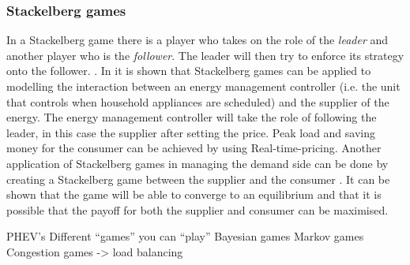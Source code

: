 \subsubsection{Stackelberg games}
In a Stackelberg game there is a player who takes on the role of the \textit{leader} and another player who is the \textit{follower}. The leader will then try to enforce its strategy onto the follower. \cite{ShohamLeyton-Brown2008}.
In \cite{ChenKishoreSnyder2011} it is shown that Stackelberg games can be applied to modelling the interaction between an energy management controller (i.e. the unit that controls when household appliances are scheduled) and the supplier of the energy. The energy management controller will take the role of following the leader, in this case the supplier after setting the price. Peak load and saving money for the consumer can be achieved by using Real-time-pricing. Another application of Stackelberg games in managing the demand side can be done by creating a Stackelberg game between the supplier and the consumer \cite{MaharjanZhuZhangEtAl2013}. It can be shown that the game will be able to converge to an equilibrium and that it is possible that the payoff for both the supplier and consumer can be maximised.


PHEV’s
Different “games” you can “play”
Bayesian games
Markov games
Congestion games -> load balancing